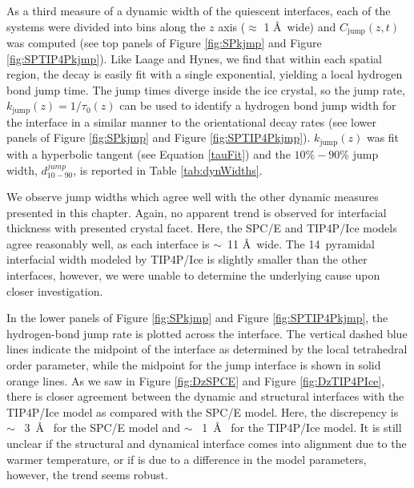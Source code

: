 As a third measure of a dynamic width of the quiescent
interfaces, each of the systems were divided into bins along the $z$
axis ($\approx$ 1 \AA\ wide) and $C_\mathrm{jump}(z,t)$ was computed
(see top panels of Figure \ref{fig:SPkjmp} and Figure
\ref{fig:SPTIP4Pkjmp}).  Like Laage and Hynes, we find that within
each spatial region, the decay is easily fit with a single
exponential, yielding a local hydrogen bond jump time. The jump times
diverge inside the ice crystal, so the jump rate,
$k_\mathrm{jump}(z) = 1 / \tau_0(z)$ can be used to identify a
hydrogen bond jump width for the interface in a similar manner to the
orientational decay rates (see lower panels of Figure \ref{fig:SPkjmp} and Figure
\ref{fig:SPTIP4Pkjmp}). $k_\mathrm{jump}(z)$ was fit with a hyperbolic
tangent (see Equation \eqref{tauFit}) and the $10\%-90\%$ jump width,
$d_\mathrm{10-90}^{jump}$, is reported in Table \ref{tab:dynWidths}.

We observe jump widths which agree well with the other dynamic
measures presented in this chapter. Again, no apparent trend is observed for
interfacial thickness with presented crystal facet. Here, the SPC/E
and TIP4P/Ice models agree reasonably well, as each interface is
$\sim$~11 \AA~wide. The 14\degree~pyramidal interfacial width modeled
by TIP4P/Ice is slightly smaller than the other interfaces, however,
we were unable to determine the underlying cause upon closer
investigation.

In the lower panels of Figure \ref{fig:SPkjmp} and Figure
\ref{fig:SPTIP4Pkjmp}, the hydrogen-bond jump rate is plotted across
the interface. The vertical dashed blue lines indicate the midpoint of
the interface as determined by the local tetrahedral order parameter,
while the midpoint for the jump interface is shown in solid orange
lines. As we saw in Figure \ref{fig:DzSPCE} and Figure
\ref{fig:DzTIP4PIce}, there is closer agreement between the dynamic
and structural interfaces with the TIP4P/Ice model as compared with
the SPC/E model. Here, the discrepency is $\sim$~ 3~\AA~ for the SPC/E
model and $\sim$~ 1~\AA~ for the TIP4P/Ice model. It is still unclear
if the structural and dynamical interface comes into alignment due to
the warmer temperature, or if is due to a difference in the model
parameters, however, the trend seems robust.

